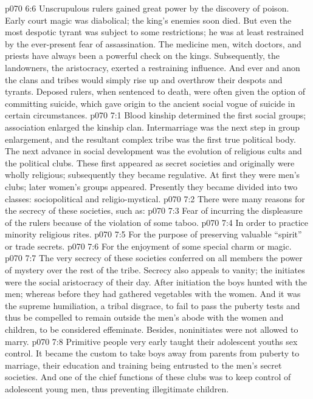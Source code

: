 \vs p070 6:6 \pc Unscrupulous rulers gained great power by the discovery of poison. Early court magic was diabolical; the king’s enemies soon died. But even the most despotic tyrant was subject to some restrictions; he was at least restrained by the ever\hyp{}present fear of assassination. The medicine men, witch doctors, and priests have always been a powerful check on the kings. Subsequently, the landowners, the aristocracy, exerted a restraining influence. And ever and anon the clans and tribes would simply rise up and overthrow their despots and tyrants. Deposed rulers, when sentenced to death, were often given the option of committing suicide, which gave origin to the ancient social vogue of suicide in certain circumstances.
\vs p070 7:1 Blood kinship determined the first social groups; association enlarged the kinship clan. Intermarriage was the next step in group enlargement, and the resultant complex tribe was the first true political body. The next advance in social development was the evolution of religious cults and the political clubs. These first appeared as secret societies and originally were wholly religious; subsequently they became regulative. At first they were men’s clubs; later women’s groups appeared. Presently they became divided into two classes: sociopolitical and religio\hyp{}mystical.
\vs p070 7:2 \pc There were many reasons for the secrecy of these societies, such as:
\vs p070 7:3 \bibnobreakspace Fear of incurring the displeasure of the rulers because of the violation of some taboo.
\vs p070 7:4 \bibnobreakspace In order to practice minority religious rites.
\vs p070 7:5 \bibnobreakspace For the purpose of preserving valuable “spirit” or trade secrets.
\vs p070 7:6 \bibnobreakspace For the enjoyment of some special charm or magic.
\vs p070 7:7 \pc The very secrecy of these societies conferred on all members the power of mystery over the rest of the tribe. Secrecy also appeals to vanity; the initiates were the social aristocracy of their day. After initiation the boys hunted with the men; whereas before they had gathered vegetables with the women. And it was the supreme humiliation, a tribal disgrace, to fail to pass the puberty tests and thus be compelled to remain outside the men’s abode with the women and children, to be considered effeminate. Besides, noninitiates were not allowed to marry.
\vs p070 7:8 \pc Primitive people very early taught their adolescent youths sex control. It became the custom to take boys away from parents from puberty to marriage, their education and training being entrusted to the men’s secret societies. And one of the chief functions of these clubs was to keep control of adolescent young men, thus preventing illegitimate children.
